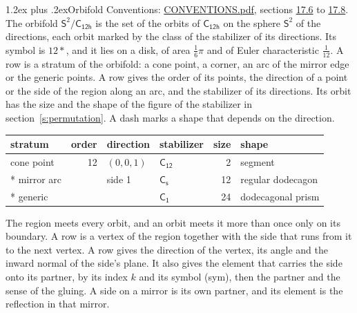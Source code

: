 \documentclass[10pt,a4paper]{article}
\makeatletter
\renewcommand\section{\@startsection{section}{1}{\z@}{-3ex plus -1ex minus -.2ex}%
  {1.2ex plus .2ex}{\normalfont\large\sffamily\bfseries\color{parttitle}}}
\numberwithin{equation}{section}
\newcommand{\grp}[1]{\mathsf{#1}}
\newcommand{\orbname}[1]{#1}
\newcommand{\dirvec}[3]{(#1, #2, #3)}
\newcommand{\twosphere}{\mathsf{S}^{2}}
\makeatother
\begin{document}
\section{Orbifold}\label{s:orbifold}
Conventions: \href{../../CONVENTIONS.pdf}{CONVENTIONS.pdf}, sections \href{../../CONVENTIONS.pdf\#conv.17.6}{17.6} to \href{../../CONVENTIONS.pdf\#conv.17.8}{17.8}.
The orbifold $\twosphere/\grp{C_{12h}}$ is the set of the orbits of $\grp{C_{12h}}$ on the sphere $\twosphere$ of the directions, each orbit marked by the class of the stabilizer of its directions. Its symbol is $\orbname{12{\ast}}$, and it lies on a disk, of area $\tfrac{1}{6}\pi$ and of Euler characteristic $\tfrac{1}{12}$.
\leavevmode\label{n:head.stratum}\label{n:head.order.point}\label{n:head.direction}\label{n:head.stabilizer}\label{n:head.size.orbit}\label{n:head.shape}A row is a stratum of the orbifold: a cone point, a corner, an arc of the mirror edge or the generic points. A row gives the order of its points, the direction of a point or the side of the region along an arc, and the stabilizer of its directions. Its orbit has the size and the shape of the figure of the stabilizer in section~\ref{s:permutation}. A dash marks a shape that depends on the direction.
{\small\setlength{\tabcolsep}{4pt}\begin{longtable}{@{}lrllrl@{}}\toprule
stratum & order & direction & stabilizer & size & shape\\\midrule\endhead
\bottomrule\endfoot\endlastfoot
cone point & 12 & $\dirvec{0}{0}{1}$ & \href{C12.pdf}{$\grp{C_{12}}$} & 2 & segment\\*
mirror arc &  & side 1 & \href{C1v.pdf}{$\grp{C_{s}}$} & 12 & regular dodecagon\\*
generic &  &  & \href{C1.pdf}{$\grp{C_{1}}$} & 24 & dodecagonal prism\\
\bottomrule\end{longtable}}
\leavevmode\label{n:head.vertex.region}\label{n:head.angle}\label{n:head.normal.side}\label{n:head.partner}\label{n:head.sense}The region meets every orbit, and an orbit meets it more than once only on its boundary. A row is a vertex of the region together with the side that runs from it to the next vertex. A row gives the direction of the vertex, its angle and the inward normal of the side's plane. It also gives the element that carries the side onto its partner, by its index $k$ and its symbol (sym), then the partner and the sense of the gluing. A side on a mirror is its own partner, and its element is the reflection in that mirror.
\end{document}
